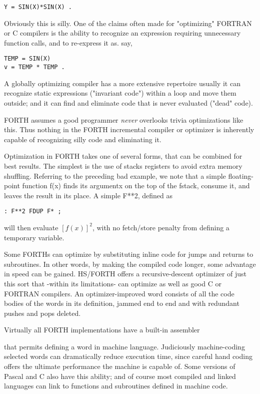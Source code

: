 \begin{verbatim}
Y = SIN(X)*SIN(X) .
\end{verbatim}

Obviously this is silly. One of the claims often made for "optimizing" FORTRAN
or C compilers is the ability to recognize an
expression requiring unnecessary function calls, and to re-express
it as. say,
  
\begin{verbatim}
TEMP = SIN(X)
v = TEMP * TEMP .
\end{verbatim}

A globally optimizing compiler has a more extensive repertoire
usually it can recognize static expressions ("invariant code")
within a loop and move them outside; and it can find and eliminate code that is
never evaluated ("dead" code).

FORTH assumes a good programmer \textit{never} overlooks trivia
optimizations like this. Thus nothing in the FORTH incremental
compiler or optimizer is inherently capable of recognizing silly
code and eliminating it.

Optimization in FORTH takes one of several forms, that can be
combined for best results. The simplest is the use of stacks
registers to avoid extra memory shuffling. Referring to the
preceding bad example, we note that a simple floating-point
function f(x) finds its argumentx on the top of the fstack, consume
it, and leaves the result in its place. A simple F**2, defined as

\begin{verbatim}
: F**2 FDUP F* ;
\end{verbatim}

will then evaluate $[f(x)]^2$, with no fetch/store penalty from defining
a temporary variable.

Some FORTHs can optimize by substituting inline code for jumps
and returns to subroutines. In other words, by making the compiled code longer,
some advantage in speed can be gained.
HS/FORTH offers a recursive-descent optimizer of just this sort
that -within its limitations- can optimize as well as good C or
FORTRAN compilers. An optimizer-improved word consists of
all the code bodies of the words in its definition, jammed end to
end and with redundant pushes and pops deleted.

Virtually all FORTH implementations have a built-in assembler

that permits defining a word in machine language. Judiciously
machine-coding selected words can dramatically reduce execution time, since
careful hand coding offers the ultimate performance the machine is capable of.
Some versions of Pascal and C
also have this ability; and of course most compiled and linked
languages can link to functions and subroutines defined in
machine code.

